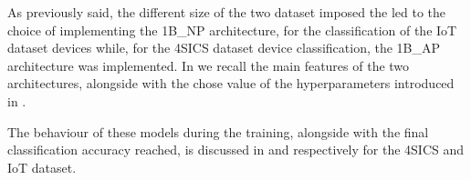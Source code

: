 As previously said, the different size of the two dataset imposed the led to the choice of implementing the 1B\_NP architecture, for the classification of the IoT dataset devices while, for the 4SICS dataset device classification, the 1B\_AP architecture was implemented. 
In  we recall the main features of the two architectures, alongside with the chose value of the hyperparameters introduced in .

The behaviour of these models during the training, alongside with the final classification accuracy reached, is discussed in  and  respectively for the 4SICS and IoT dataset.





